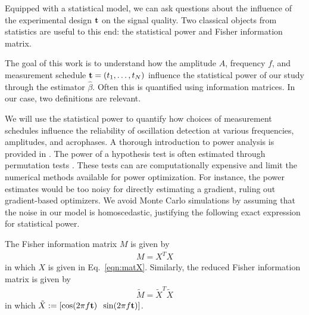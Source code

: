 \documentclass{article}
\begin{document}

Equipped with a statistical model, we can ask questions about the influence of the experimental design $\mathbf{t}$ on the signal quality. Two classical objects from statistics are useful to this end: the  statistical power and Fisher information matrix.


The goal of this work is to understand how the amplitude $A$, frequency $f$, and measurement schedule $\mathbf{t}=(t_1,\ldots,t_N)$ influence the statistical power of our study through the estimator $\hat{\beta}$. Often this is quantified using information matrices. In our case, two definitions are relevant.

We will use the statistical power to quantify how choices of measurement schedules influence the reliability of oscillation detection at various frequencies, amplitudes, and acrophases. A thorough introduction to power analysis is provided in \cite{wassermanTextbook}. The power of a hypothesis test is often estimated through permutation tests \cite{Boos2000-hd}. These tests can are computationally expensive and limit the numerical methods available for power optimization. For instance, the power estimates would be too noisy for directly estimating a gradient, ruling out gradient-based optimizers. We avoid Monte Carlo simulations by assuming that the noise in our model is homoscedastic, justifying the following exact expression for statistical power.


\begin{defn}
The Fisher information matrix $M$ is given by
\begin{align}
 M = X^T X
\end{align}
in which $X$ is given in Eq.~\eqref{eqn:matX}. Similarly, the reduced Fisher information matrix is given by
\begin{align}
\tilde{M} = \tilde{X}^T \tilde{X}
\end{align}
in which  $\tilde{X} := [\cos(2\pi f \mathbf{t}) \;\; \sin(2\pi f \mathbf{t})]$.
\end{defn}
\end{document}

